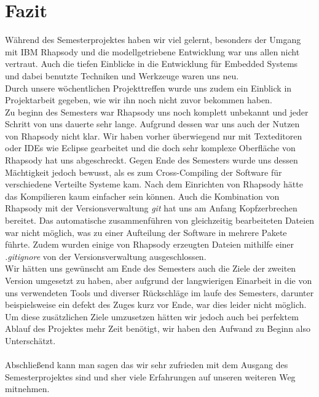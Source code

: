 \chapter{Fazit}

Während des Semesterprojektes haben wir viel gelernt, besonders der Umgang mit IBM Rhapsody und die modellgetriebene Entwicklung war uns allen nicht vertraut. Auch die tiefen Einblicke in die Entwicklung für Embedded Systems und dabei benutzte Techniken und Werkzeuge waren uns neu.\\
Durch unsere wöchentlichen Projekttreffen wurde uns zudem ein Einblick in Projektarbeit gegeben, wie wir ihn noch nicht zuvor bekommen haben.\\
Zu beginn des Semesters war Rhapsody uns noch komplett unbekannt und jeder Schritt von uns dauerte sehr lange. Aufgrund dessen war uns auch der Nutzen von Rhapsody nicht klar. Wir haben vorher überwiegend nur mit Texteditoren oder IDEs wie Eclipse gearbeitet und die doch sehr komplexe Oberfläche von Rhapsody hat uns abgeschreckt. Gegen Ende des Semesters wurde uns dessen Mächtigkeit jedoch bewusst, als es zum Cross-Compiling der Software für verschiedene Verteilte Systeme kam. Nach dem Einrichten von Rhapsody hätte das Kompilieren kaum einfacher sein können. Auch die Kombination von Rhapsody mit der Versionsverwaltung \textit{git} hat uns am Anfang Kopfzerbrechen bereitet. Das automatische zusammenführen von gleichzeitig bearbeiteten Dateien war nicht möglich, was zu einer Aufteilung der Software in mehrere Pakete führte. Zudem wurden einige von Rhapsody erzeugten Dateien mithilfe einer \textit{.gitignore} von der Versionsverwaltung ausgeschlossen.\\
Wir hätten uns gewünscht am Ende des Semesters auch die Ziele der zweiten Version umgesetzt zu haben, aber aufgrund der langwierigen Einarbeit in die von uns verwendeten Tools und diverser Rückschläge im laufe des Semesters, darunter beispielsweise ein defekt des Zuges kurz vor Ende, war dies leider nicht möglich. Um diese zusätzlichen Ziele umzusetzen hätten wir jedoch auch bei perfektem Ablauf des Projektes mehr Zeit benötigt, wir haben den Aufwand zu Beginn also Unterschätzt.\\\\
Abschließend kann man sagen das wir sehr zufrieden mit dem Ausgang des Semesterprojektes sind und sher viele Erfahrungen auf unseren weiteren Weg mitnehmen.